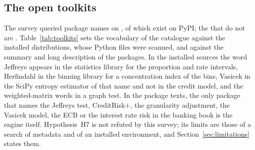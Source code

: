 \subsection{The open toolkits}

The survey queried \pypiQueried{} package names on \pypiDate{}, of which \pypiFound{} exist on PyPI; the \pypiMissing{} that do not are \pypiMissingNames{}. Table~\ref{tab:toolkits} sets the vocabulary of the catalogue against the \distScanned{} installed distributions, whose \filesScanned{} Python files were scanned, and against the summary and long description of the \pypiFound{} packages. In the installed sources the word Jeffreys appears in the statistics library for the proportion and rate intervals, Herfindahl in the binning library for a concentration index of the bins, Vasicek in the SciPy entropy estimator of that name and not in the credit model, and the weighted-matrix words in a graph test. In the package texts, the only package that names the Jeffreys test, CreditRisk+, the granularity adjustment, the Vasicek model, the ECB or the interest rate risk in the banking book is the engine itself. Hypothesis~H7 is not refuted by this survey; its limits are those of a search of metadata and of an installed environment, and Section~\ref{sec:limitations} states them.


